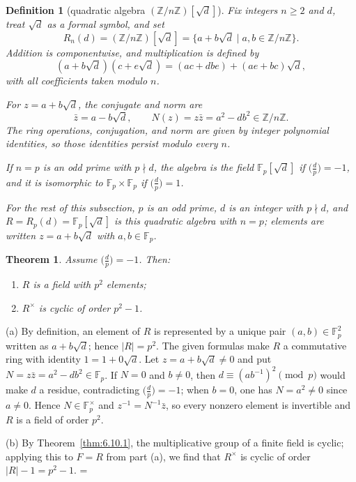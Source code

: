 \documentclass[11pt]{article}
\makeatletter
\let\nt@closedisplay\]
\def\nt@guardedclose{\@ifnextchar\par{\nt@closeafterpar}{\@ifnextchar\end{\postdisplaypenalty\@M\nt@closedisplay}{\nt@closedisplay}}}
\def\nt@closeafterpar\par{\@ifnextchar\par{\nt@closeafterpar}{\@ifnextchar\end{\postdisplaypenalty\@M\nt@closedisplay\par}{\nt@closedisplay\par}}}
\renewenvironment{proof}[1][\proofname]{\par
  \pushQED{\qed}\normalfont\topsep\medskipamount\edef\nt@afterproof{\@endparpenalty=\the\@endparpenalty\relax}\@beginparpenalty\@M\@endparpenalty\@M\let\]\nt@guardedclose\trivlist\item[]\textit{#1\@addpunct{.}} \ignorespaces}{\ifvmode\addpenalty\@M\fi\popQED\nt@afterproof\endtrivlist\@endpefalse}
\theoremstyle{ntstyle}
\newtheorem{theorem}{Theorem}[subsection]
\newtheorem{definition}{Definition}[subsection]
\newcommand{\legs}[2]{\bigl(\tfrac{#1}{#2}\bigr)}
\makeatother
\begin{document}
\begin{definition}[{quadratic algebra $(\mathbb{Z}/n\mathbb{Z})[\sqrt{d}]$}]\label{def:7.9.1}\label{def:quadratic-algebra-z-nz-sqrt-d}
  Fix integers $n\ge2$ and $d$, treat $\sqrt d$ as a formal symbol, and
  set
  \[
    R_n(d)=(\mathbb{Z}/n\mathbb{Z})[\sqrt d]
    =\{a+b\sqrt d\mid a,b\in\mathbb{Z}/n\mathbb{Z}\}.
  \]
  Addition is componentwise, and multiplication is defined by
  \[
    (a+b\sqrt d)(c+e\sqrt d)
    =(ac+dbe)+(ae+bc)\sqrt d,
  \]
  with all coefficients taken modulo $n$.

  For $z=a+b\sqrt d$, the conjugate and norm are
  \[
    \bar z=a-b\sqrt d,
    \qquad
    N(z)=z\bar z=a^2-db^2\in\mathbb{Z}/n\mathbb{Z}.
  \]
  The ring operations, conjugation, and norm are given by integer
  polynomial identities, so those identities persist modulo every $n$.

  If $n=p$ is an odd prime with $p\nmid d$, the algebra is the field $\mathbb{F}_p[\sqrt d]$ if $\legs{d}{p}=-1$,
  and it is isomorphic to $\mathbb{F}_p\times\mathbb{F}_p$ if $\legs{d}{p}=1$.

  For the rest of this subsection, $p$ is an odd prime,
  $d$ is an integer with $p\nmid d$, and
  $R=R_p(d)=\mathbb{F}_p[\sqrt d]$ is this quadratic algebra with
  $n=p$; elements are written $z=a+b\sqrt d$ with
  $a,b\in\mathbb{F}_p$.

\end{definition}

\begin{theorem}\label{thm:7.9.1} Assume $\legs{d}{p}=-1$. Then:
  \begin{enumerate}[label={\alph*)}]
    \item $R$ is a field with $p^{2}$ elements;
    \item $R^{\times}$ is cyclic of order $p^{2}-1$.
  \end{enumerate}

\end{theorem}

\begin{proof} (a) By definition, an element of $R$ is represented by a
  unique pair $(a,b)\in\mathbb{F}_p^2$ written as $a+b\sqrt{d}$; hence
  $|R|=p^2$. The given formulas make $R$ a commutative ring with
  identity $1 = 1 + 0\sqrt{d}$. Let $z = a + b\sqrt{d} \neq 0$ and put
  $N = z\bar z = a^2 - d b^2 \in \mathbb{F}_p$. If $N = 0$ and $b \neq 0$, then $d \equiv (a b^{-1})^2 \pmod{p}$
  would make $d$ a residue,
  contradicting $\legs{d}{p} = -1$; when $b = 0$, one has $N = a^2 \neq 0$ since $a \neq 0$. Hence
  $N \in \mathbb{F}_p^{\times}$ and
  $z^{-1} = N^{-1}\bar z$, so every nonzero element is invertible and
  $R$ is a field of order $p^2$.

  (b) By Theorem~\ref{thm:6.10.1}, the multiplicative group of a finite field
  is cyclic; applying this to $F=R$ from part (a), we find that $R^{\times}$ is cyclic of
  order $|R|-1=p^{2}-1$.
\end{proof}
\end{document}
